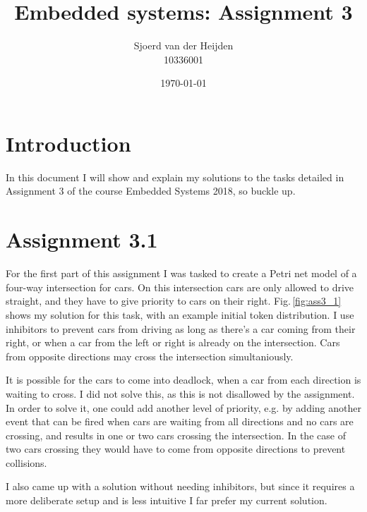 \documentclass{article}
\title{Embedded systems: Assignment 3}
\date{\today}
\author{Sjoerd van der Heijden \\ 10336001}
\begin{document}
	\maketitle
	\tableofcontents
	\section{Introduction}
	\par In this document I will show and explain my solutions to the tasks detailed in Assignment 3 of the course Embedded Systems 2018, so buckle up.
	
	\section{Assignment 3.1}
	\par For the first part of this assignment I was tasked to create a Petri net model of a four-way intersection for cars. On this intersection cars are only allowed to drive straight, and they have to give priority to cars on their right. 	Fig.\,\ref{fig:ass3_1} shows my solution for this task, with an example initial token distribution. I use inhibitors to prevent cars from driving as long as there's a car coming from their right, or when a car from the left or right is already on the intersection. Cars from opposite directions may cross the intersection simultaniously.
	\par It is possible for the cars to come into deadlock, when a car from each direction is waiting to cross. I did not solve this, as this is not disallowed by the assignment. In order to solve it, one could add another level of priority, e.g. by adding another event that can be fired when cars are waiting from all directions and no cars are crossing, and results in one or two cars crossing the intersection. In the case of two cars crossing they would have to come from opposite directions to prevent collisions.
	\par I also came up with a solution without needing inhibitors, but since it requires a more deliberate setup and is less intuitive I far prefer my current solution.
	
\end{document}
